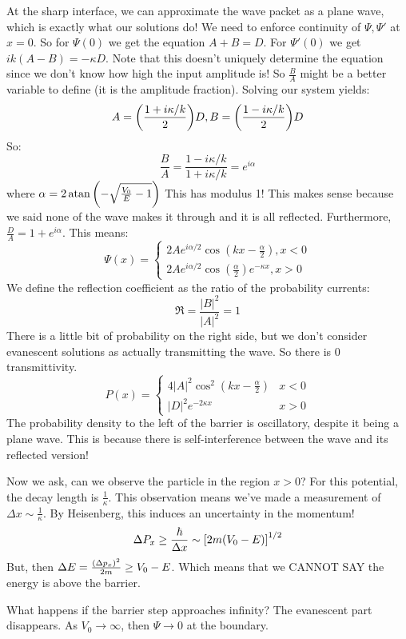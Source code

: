 At the sharp interface, we can approximate the wave packet as a plane wave, which is exactly what our solutions do! We need to enforce
continuity of $\Psi, \Psi'$ at $x = 0$. So for $\Psi(0)$ we get the equation $A + B = D$. For $\Psi'(0)$ we get $ik(A - B) = -\kappa D$.
Note that this doesn't uniquely determine the equation since we don't know how high the input amplitude is! So $\frac{B}{A}$ might be a better
variable to define (it is the amplitude fraction). Solving our system yields:
\[ A = \qty(\frac{1 + i\kappa/k}{2})D, B =  \qty(\frac{1 - i\kappa/k}{2})D \]
So:
\[ \frac{B}{A} = \frac{1 - i\kappa/k}{1 + i\kappa/k} = e^{i \alpha} \]
where $\alpha = 2\atan\qty(- \sqrt{\frac{V_0}{E} - 1})$
This has modulus 1! This makes sense because we said none of the wave makes it through and it is all reflected.
Furthermore, $\frac{D}{A} = 1 + e^{i\alpha}$. This means:
\[ \Psi(x) = \begin{cases}
    2Ae^{i\alpha/2} \cos(kx - \frac{\alpha}{2}), x < 0 \\
    2Ae^{i\alpha/2} \cos(\frac{\alpha}{2})  e^{-\kappa x}, x > 0
\end{cases} \]
We define the reflection coefficient as the ratio of the probability currents:
\[ \mathfrak{R} = \frac{|B|^2}{|A|^2} = 1 \]
There is a little bit of probability on the right side, but we don't consider evanescent solutions as actually transmitting the wave. So there is 0 transmittivity.
\[ P(x) = \begin{cases} 
    4 |A|^2 \cos^2 (kx - \frac{\alpha}{2}) & x<0 \\
    |D|^2 e^{-2\kappa x} & x > 0
\end{cases} \]
The probability density to the left of the barrier is oscillatory, despite it being a plane wave. This is because there is self-interference between the wave and its reflected version!

Now we ask, can we observe the particle in the region $x > 0$? For this potential, the decay length is $\frac{1}{\kappa}$.
This observation means we've made a measurement of $\Delta x \sim \frac{1}{\kappa}$. By Heisenberg, this induces an uncertainty in the momentum!
\[ \Delta P_x \geq \frac{\hbar}{\Delta x} \sim \qty[2m(V_0 - E)]^{1/2} \]
But, then $\Delta E = \frac{\qty(\Delta p_x)^2}{2m} \geq V_0 - E$. Which means that we CANNOT SAY the energy is above the barrier.

What happens if the barrier step approaches infinity? The evanescent part disappears. As $V_0 \to \infty$, then $\Psi \to 0$ at the boundary.

